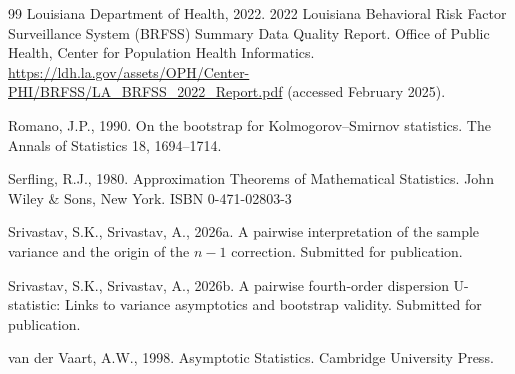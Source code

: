 \documentclass[12pt,a4paper]{article}
\begin{document}
\begin{thebibliography}{99}
Louisiana Department of Health, 2022.
2022 Louisiana Behavioral Risk Factor Surveillance System (BRFSS) Summary Data Quality Report.
Office of Public Health, Center for Population Health Informatics.
\url{https://ldh.la.gov/assets/OPH/Center-PHI/BRFSS/LA_BRFSS_2022_Report.pdf} (accessed February 2025).

Romano, J.P., 1990.
On the bootstrap for Kolmogorov--Smirnov statistics.
The Annals of Statistics 18, 1694--1714.

Serfling, R.J., 1980.
Approximation Theorems of Mathematical Statistics.
John Wiley \& Sons, New York.
ISBN 0-471-02803-3

Srivastav, S.K., Srivastav, A., 2026a.
A pairwise interpretation of the sample variance and the origin of the $n-1$ correction.
Submitted for publication.

Srivastav, S.K., Srivastav, A., 2026b.
A pairwise fourth-order dispersion U-statistic: Links to variance asymptotics and bootstrap validity.
Submitted for publication.

van der Vaart, A.W., 1998.
Asymptotic Statistics.
Cambridge University Press.

\end{thebibliography}
\end{document}
